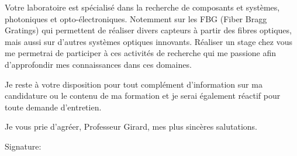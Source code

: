 \documentclass[11pt]{article}
\begin{document}
\vspace{0.5cm}
Votre laboratoire est spécialisé dans la recherche de composants et systèmes, photoniques et opto-électroniques. Notemment sur les FBG (Fiber Bragg Gratings) qui permettent de réaliser divers capteurs à partir des fibres optiques, mais aussi sur d'autres systèmes optiques innovants. Réaliser un stage chez vous me permetrai de participer à ces activités de recherche qui me passione afin d'approfondir mes connaissances dans ces domaines.

\vspace{0.5cm}
Je reste à votre disposition pour tout complément d'information sur ma candidature ou le contenu de ma formation et je serai également réactif pour toute demande d'entretien.


\vspace{0.5cm}
Je vous prie d'agréer, Professeur Girard, mes plus sincères salutations.

\vspace{1cm}

\hfill
Signature: \hspace{5cm}
\end{document}
